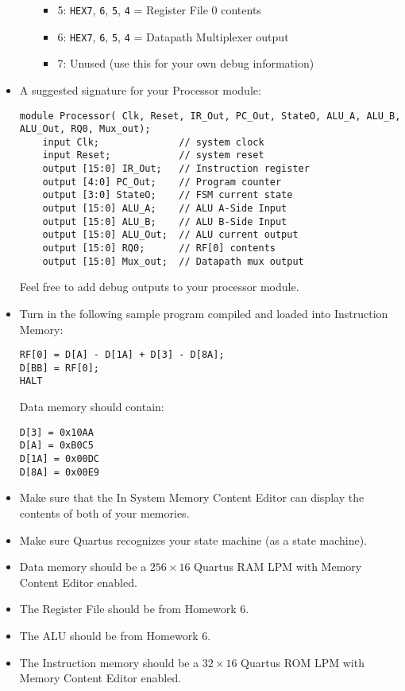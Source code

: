 \begin{itemize}
\begin{itemize}
\begin{itemize}
            \item 5: \verb|HEX7|, \verb|6|, \verb|5|, \verb|4| = Register File 0 contents
            \item 6: \verb|HEX7|, \verb|6|, \verb|5|, \verb|4| = Datapath Multiplexer output
            \item 7: Unused (use this for your own debug information)
        \end{itemize}
    \end{itemize}
    \item A suggested signature for your Processor module:
    \begin{lstlisting}
module Processor( Clk, Reset, IR_Out, PC_Out, StateO, ALU_A, ALU_B, ALU_Out, RQ0, Mux_out);
    input Clk;              // system clock
    input Reset;            // system reset
    output [15:0] IR_Out;   // Instruction register
    output [4:0] PC_Out;    // Program counter
    output [3:0] StateO;    // FSM current state
    output [15:0] ALU_A;    // ALU A-Side Input
    output [15:0] ALU_B;    // ALU B-Side Input
    output [15:0] ALU_Out;  // ALU current output
    output [15:0] RQ0;      // RF[0] contents
    output [15:0] Mux_out;  // Datapath mux output
    \end{lstlisting}
    Feel free to add debug outputs to your processor module.
    \item Turn in the following sample program compiled and loaded into Instruction Memory:
    \begin{lstlisting}
RF[0] = D[A] - D[1A] + D[3] - D[8A];
D[BB] = RF[0];
HALT
    \end{lstlisting}
    Data memory should contain:
    \begin{lstlisting}
D[3] = 0x10AA
D[A] = 0xB0C5
D[1A] = 0x00DC
D[8A] = 0x00E9
    \end{lstlisting}
    \item Make sure that the In System Memory Content Editor can display the contents of both of your memories.
    \item Make sure Quartus recognizes your state machine (as a state machine).
    \item Data memory should be a $256 \times 16$ Quartus RAM LPM with Memory Content Editor enabled.
    \item The Register File should be from Homework 6.
    \item The ALU should be from Homework 6.
    \item The Instruction memory should be a $32 \times  16$ Quartus ROM LPM with Memory Content Editor enabled.

\end{itemize}
